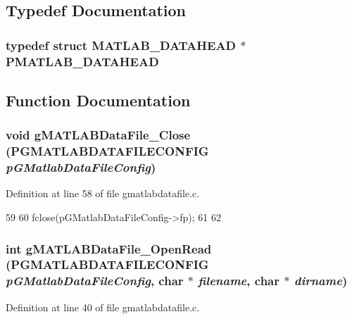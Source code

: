 \subsection{Typedef Documentation}
\subsubsection[{PMATLAB\_\-DATAHEAD}]{\setlength{\rightskip}{0pt plus 5cm}typedef  struct {\bf MATLAB\_\-DATAHEAD} $\ast$ {\bf PMATLAB\_\-DATAHEAD}}\label{gmatlabdatafile_8c_a558f122e40bebf320e29b4720893a94a}


\subsection{Function Documentation}
\subsubsection[{gMATLABDataFile\_\-Close}]{\setlength{\rightskip}{0pt plus 5cm}void gMATLABDataFile\_\-Close ({\bf PGMATLABDATAFILECONFIG} {\em pGMatlabDataFileConfig})}\label{gmatlabdatafile_8c_ad38283a16cbd66a2834b2ca9f5c6c6e0}


Definition at line 58 of file gmatlabdatafile.c.


\begin{DoxyCode}
59 {
60         fclose(pGMatlabDataFileConfig->fp);
61 
62 }
\end{DoxyCode}
\subsubsection[{gMATLABDataFile\_\-OpenRead}]{\setlength{\rightskip}{0pt plus 5cm}int gMATLABDataFile\_\-OpenRead ({\bf PGMATLABDATAFILECONFIG} {\em pGMatlabDataFileConfig}, \/  char $\ast$ {\em filename}, \/  char $\ast$ {\em dirname})}\label{gmatlabdatafile_8c_a82d0dd8169ca82a67bb2d78ee1efbafe}


Definition at line 40 of file gmatlabdatafile.c.


